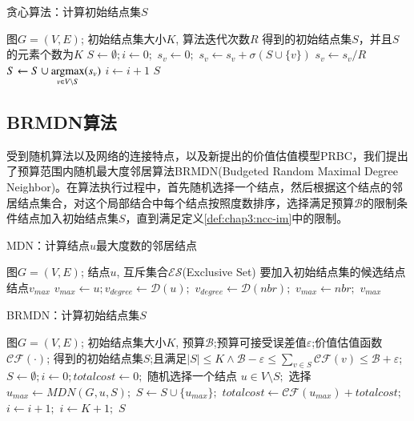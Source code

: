 \begin{algorithm}
\caption{贪心算法：计算初始结点集$S$}
\label{alg:chap3:general-greedy}
\begin{algorithmic}
\REQUIRE 图$G=(V,E)$; 初始结点集大小$K$, 算法迭代次数$R$
\ENSURE 得到的初始结点集$S$，并且$S$的元素个数为$K$
\STATE $S \leftarrow \emptyset; i \leftarrow 0;$
		\STATE $s_{v} \leftarrow 0;$
			\STATE $s_{v} \leftarrow s_{v} + \sigma(S \cup \{v\})$
		\ENDFOR
		\STATE $s_{v} \leftarrow s_{v}/R$
	\ENDFOR
	\STATE $S \leftarrow S \cup \mathop{\rm argmax} \limits_{v \in V \setminus S}(s_{v})$
	\STATE $i \leftarrow i + 1$
\ENDWHILE
\RETURN $S$
\end{algorithmic}
\end{algorithm}


\subsection{BRMDN算法}
受到随机算法以及网络的连接特点，以及新提出的价值估值模型PRBC，我们提出了预算范围内随机最大度邻居算法BRMDN(Budgeted Random Maximal Degree Neighbor)。在算法执行过程中，首先随机选择一个结点，然后根据这个结点的邻居结点集合，对这个局部结合中每个结点按照度数排序，选择满足预算$\mathcal{B}$的限制条件结点加入初始结点集$S$，直到满足定义\ref{def:chap3:ncc-im}中的限制。


\begin{algorithm}
\caption{MDN：计算结点$u$最大度数的邻居结点}
\label{alg:chap3:mdn-alg}
\begin{algorithmic}
\REQUIRE 图$G=(V,E)$; 结点$u$, 互斥集合$\mathcal{ES}$(Exclusive Set)
\ENSURE 要加入初始结点集的候选结点结点$v_{max}$
\STATE $v_{max} \leftarrow u; v_{degree} \leftarrow \mathcal{D}(u);$
		\STATE $v_{degree} \leftarrow \mathcal{D}(nbr);$
		\STATE $v_{max} \leftarrow nbr;$
	\ENDIF
\ENDFOR
\RETURN $v_{max}$
\end{algorithmic}
\end{algorithm}


\begin{algorithm}
\caption{BRMDN：计算初始结点集$S$}
\label{alg:chap3:brmnd-alg}
\begin{algorithmic}
\REQUIRE 图$G=(V,E)$; 初始结点集大小$K$, 预算$\mathcal{B}$;预算可接受误差值$\varepsilon$;价值估值函数$\mathcal{CF}(\cdot)$;
\ENSURE 得到的初始结点集$S$;且满足$|S| \leq K \wedge \mathcal{B} - \varepsilon \leq \sum_{v \in S}\mathcal{CF}(v) \leq \mathcal{B} + \varepsilon$;
\STATE $S \leftarrow \emptyset; i \leftarrow 0; totalcost \leftarrow 0;$
	\STATE 随机选择一个结点 $u \in V \setminus S;$
	\STATE 选择$u_{max} \leftarrow MDN(G, u, S);$
		\STATE $S \leftarrow S \cup \{u_{max}\};$
		\STATE $totalcost \leftarrow \mathcal{CF}(u_{max}) + totalcost;$
		\STATE $i \leftarrow i + 1;$
			\STATE $ i \leftarrow K + 1;$
		\ENDIF
	\ENDIF
\ENDWHILE
\RETURN $S$
\end{algorithmic}
\end{algorithm}


